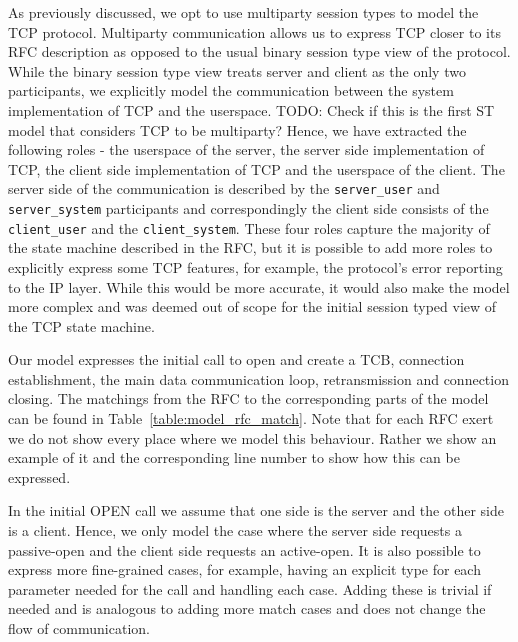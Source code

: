 \documentclass{article}
\newcommand{\todo}[1]{}
\renewcommand{\todo}[1]{{\color{red} TODO: {#1}}}
\newcommand{\type}[1]{\texttt{#1}}
\newcommand{\serveruser}{\type{server\_user}}
\newcommand{\serversystem}{\type{server\_system}}
\newcommand{\clientuser}{\type{client\_user}}
\newcommand{\clientsystem}{\type{client\_system}}
\begin{document}
As previously discussed, we opt to use multiparty session types to model the TCP protocol.
Multiparty communication allows us to express TCP closer to its RFC description as opposed to the usual binary session type view of the protocol.
While the binary session type view treats server and client as the only two participants, we explicitly model the communication between the system implementation of TCP and the userspace.
\todo{Check if this is the first ST model that considers TCP to be multiparty?}
Hence, we have extracted the following roles - the userspace of the server, the server side implementation of TCP, the client side implementation of TCP and the userspace of the client.
The server side of the communication is described by the {\serveruser} and {\serversystem} participants and correspondingly the client side  consists of the {\clientuser} and the {\clientsystem}.
These four roles capture the majority of the state machine described in the RFC, but it is possible to add more roles to explicitly express some TCP features, for example, the protocol's error reporting to the IP layer.
While this would be more accurate, it would also make the model more complex and was deemed out of scope for the initial session typed view of the TCP state machine.

Our model expresses the initial call to open and create a TCB, connection establishment, the main data communication loop, retransmission and connection closing.
The matchings from the RFC to the corresponding parts of the model can be found in Table~\ref{table:model_rfc_match}.
Note that for each RFC exert we do not show every place where we model this behaviour.
Rather we show an example of it and the corresponding line number to show how this can be expressed.

In the initial OPEN call we assume that one side is the server and the other side is a client.
Hence, we only model the case where the server side requests a passive-open and the client side requests an active-open.
It is also possible to express more fine-grained cases, for example, having an explicit type for each parameter needed for the call and handling each case.
Adding these is trivial if needed and is analogous to adding more match cases and does not change the flow of communication.
\end{document}
